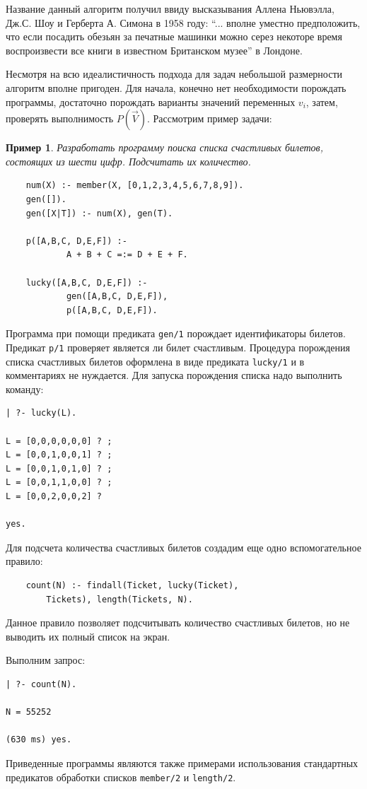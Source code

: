 \documentclass[12pt, openany, twoside]{book} %
\newtheorem{example}{Пример}[chapter]
\begin{document}
Название данный алгоритм получил ввиду высказывания Аллена Ньювэлла, Дж.С. Шоу и Герберта А. Симона в 1958 году: ``... вполне уместно предположить, что если посадить обезьян за печатные машинки можно серез некоторе время воспроизвести все книги в известном Британском музее'' в Лондоне.

Несмотря на всю идеалистичность подхода для задач небольшой размерности алгоритм вполне пригоден. Для начала, конечно нет необходимости порождать программы, достаточно порождать варианты значений переменных $v_i$, затем, проверять выполнимость $P(\vec{V})$. Рассмотрим пример задачи:
\begin{example}
Разработать программу поиска списка счастливых билетов, состоящих из шести цифр. Подсчитать их количество.
\end{example}

{\tt\begin{verbatim}
    num(X) :- member(X, [0,1,2,3,4,5,6,7,8,9]).
    gen([]).
    gen([X|T]) :- num(X), gen(T).

    p([A,B,C, D,E,F]) :-
            A + B + C =:= D + E + F.

    lucky([A,B,C, D,E,F]) :-
            gen([A,B,C, D,E,F]),
            p([A,B,C, D,E,F]).
\end{verbatim}}

Программа при помощи предиката \texttt{gen/1} порождает идентификаторы билетов. Предикат \texttt{p/1} проверяет является ли билет счастливым. Процедура порождения списка счастливых билетов оформлена в виде предиката \texttt{lucky/1} и в комментариях не нуждается. Для запуска порождения списка надо выполнить команду:
{\tt\begin{verbatim}
| ?- lucky(L).

L = [0,0,0,0,0,0] ? ;
L = [0,0,1,0,0,1] ? ;
L = [0,0,1,0,1,0] ? ;
L = [0,0,1,1,0,0] ? ;
L = [0,0,2,0,0,2] ?

yes.
\end{verbatim}}
Для подсчета количества счастливых билетов создадим еще одно вспомогательное правило:
{\tt\begin{verbatim}
    count(N) :- findall(Ticket, lucky(Ticket),
        Tickets), length(Tickets, N).
\end{verbatim}}
\noindent{}Данное правило позволяет подсчитывать количество счастливых билетов, но не выводить их полный список на экран.

Выполним запрос:
{\tt\begin{verbatim}
| ?- count(N).

N = 55252

(630 ms) yes.
\end{verbatim}}
\noindent{}Приведенные программы являются также примерами использования стандартных предикатов обработки списков \texttt{member/2} и \texttt{length/2}.
\end{document}

